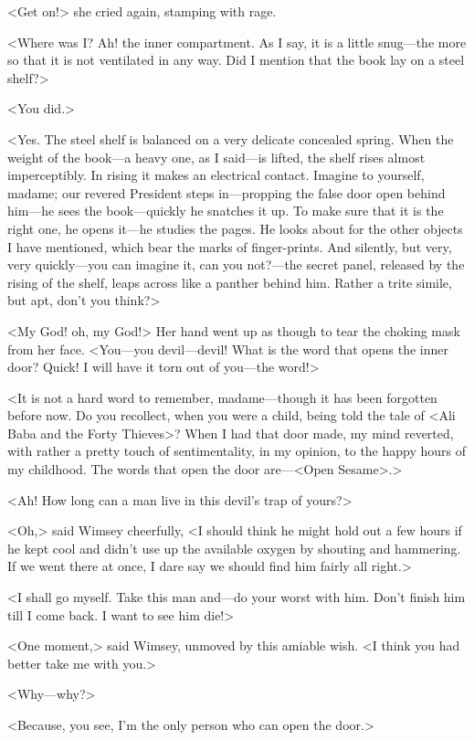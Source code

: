 <Get on!> she cried again, stamping with rage.

<Where was I\@? Ah! the inner compartment. As I say, it is a little snug—the more so that it is not ventilated in any way. Did I mention that the book lay on a steel shelf?>

<You did.>

<Yes. The steel shelf is balanced on a very delicate concealed spring. When the weight of the book—a heavy one, as I said—is lifted, the shelf rises almost imperceptibly. In rising it makes an electrical contact. Imagine to yourself, madame; our revered President steps in—propping the false door open behind him—he sees the book—quickly he snatches it up. To make sure that it is the right one, he opens it—he studies the pages. He looks about for the other objects I have mentioned, which bear the marks of finger-prints. And silently, but very, very quickly—you can imagine it, can you not?—the secret panel, released by the rising of the shelf, leaps across like a panther behind him. Rather a trite simile, but apt, don't you think?>

<My God! oh, my God!> Her hand went up as though to tear the choking mask from her face. <You—you devil—devil! What is the word that opens the inner door? Quick! I will have it torn out of you—the word!>

<It is not a hard word to remember, madame—though it has been forgotten before now. Do you recollect, when you were a child, being told the tale of <Ali Baba and the Forty Thieves>? When I had that door made, my mind reverted, with rather a pretty touch of sentimentality, in my opinion, to the happy hours of my childhood. The words that open the door are—<Open Sesame>.>

<Ah! How long can a man live in this devil's trap of yours?>

<Oh,> said Wimsey cheerfully, <I should think he might hold out a few hours if he kept cool and didn't use up the available oxygen by shouting and hammering. If we went there at once, I dare say we should find him fairly all right.>

<I shall go myself. Take this man and—do your worst with him. Don't finish him till I come back. I want to see him die!>

<One moment,> said Wimsey, unmoved by this amiable wish. <I think you had better take me with you.>

<Why—why?>

<Because, you see, I'm the only person who can open the door.>


